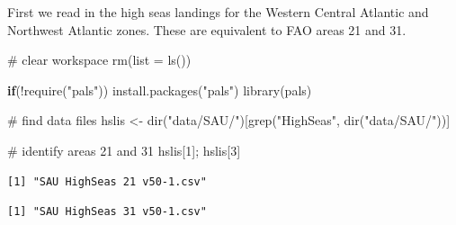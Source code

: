 \documentclass[
]{article}
\newenvironment{Shaded}{\begin{snugshade}}{\end{snugshade}}
\newcommand{\AttributeTok}[1]{\textcolor[rgb]{0.40,0.45,0.13}{#1}}
\newcommand{\CommentTok}[1]{\textcolor[rgb]{0.37,0.37,0.37}{#1}}
\newcommand{\ControlFlowTok}[1]{\textcolor[rgb]{0.00,0.23,0.31}{\textbf{#1}}}
\newcommand{\DecValTok}[1]{\textcolor[rgb]{0.68,0.00,0.00}{#1}}
\newcommand{\FunctionTok}[1]{\textcolor[rgb]{0.28,0.35,0.67}{#1}}
\newcommand{\NormalTok}[1]{\textcolor[rgb]{0.00,0.23,0.31}{#1}}
\newcommand{\OtherTok}[1]{\textcolor[rgb]{0.00,0.23,0.31}{#1}}
\newcommand{\SpecialCharTok}[1]{\textcolor[rgb]{0.37,0.37,0.37}{#1}}
\newcommand{\StringTok}[1]{\textcolor[rgb]{0.13,0.47,0.30}{#1}}
\begin{document}
First we read in the high seas landings for the Western Central Atlantic
and Northwest Atlantic zones. These are equivalent to FAO areas 21 and
31.

\begin{Shaded}
\begin{Highlighting}[]
\CommentTok{\# clear workspace}
\FunctionTok{rm}\NormalTok{(}\AttributeTok{list =} \FunctionTok{ls}\NormalTok{())}

\ControlFlowTok{if}\NormalTok{(}\SpecialCharTok{!}\FunctionTok{require}\NormalTok{(}\StringTok{"pals"}\NormalTok{)) }\FunctionTok{install.packages}\NormalTok{(}\StringTok{"pals"}\NormalTok{)}
\FunctionTok{library}\NormalTok{(pals)}

\CommentTok{\# find data files}
\NormalTok{hslis }\OtherTok{\textless{}{-}} \FunctionTok{dir}\NormalTok{(}\StringTok{"data/SAU/"}\NormalTok{)[}\FunctionTok{grep}\NormalTok{(}\StringTok{"HighSeas"}\NormalTok{, }\FunctionTok{dir}\NormalTok{(}\StringTok{"data/SAU/"}\NormalTok{))]}

\CommentTok{\# identify areas 21 and 31}
\NormalTok{hslis[}\DecValTok{1}\NormalTok{]; hslis[}\DecValTok{3}\NormalTok{]   }
\end{Highlighting}
\end{Shaded}

\begin{verbatim}
[1] "SAU HighSeas 21 v50-1.csv"
\end{verbatim}

\begin{verbatim}
[1] "SAU HighSeas 31 v50-1.csv"
\end{verbatim}

\begin{Shaded}
\end{Shaded}
\end{document}
